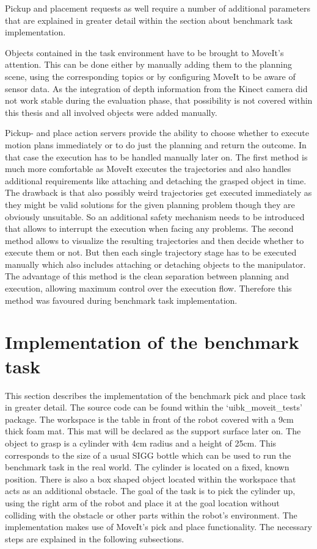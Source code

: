 Pickup and placement requests as well require a number of additional parameters that are explained in greater detail within the section about benchmark task implementation. 

Objects contained in the task environment have to be brought to MoveIt's attention. This can be done either by manually adding them to the planning scene, using the corresponding topics or by configuring MoveIt to be aware of sensor data. As the integration of depth information from the Kinect camera did not work stable during the evaluation phase, that possibility is not covered within this thesis and all involved objects were added manually.

Pickup- and place action servers provide the ability to choose whether to execute motion plans immediately or to do just the planning and return the outcome. In that case the execution has to be handled manually later on. 
The first method is much more comfortable as MoveIt executes the trajectories and also handles additional requirements like attaching and detaching the grasped object in time. The drawback is that also possibly weird trajectories get executed immediately as they might be valid solutions for the given planning problem though they are obviously unsuitable. So an additional safety mechanism needs to be introduced that allows to interrupt the execution when facing any problems.
The second method allows to visualize the resulting trajectories and then decide whether to execute them or not. But then each single trajectory stage has to be executed manually which also includes attaching or detaching objects to the manipulator. The advantage of this method is the clean separation between planning and execution, allowing maximum control over the execution flow. Therefore this method was favoured during benchmark task implementation.

\section{Implementation of the benchmark task}

This section describes the implementation of the benchmark pick and place task in greater detail. The source code can be found within the `uibk\_moveit\_tests' package. The workspace is the table in front of the robot covered with a 9cm thick foam mat. This mat will be declared as the support surface later on. The object to grasp is a cylinder with 4cm radius and a height of 25cm. This corresponds to the size of a usual SIGG bottle which can be used to run the benchmark task in the real world. The cylinder is located on a fixed, known position. There is also a box shaped object located within the workspace that acts as an additional obstacle. The goal of the task is to pick the cylinder up, using the right arm of the robot and place it at the goal location without colliding with the obstacle or other parts within the robot's environment. The implementation makes use of MoveIt's pick and place functionality. The necessary steps are explained in the following subsections.

